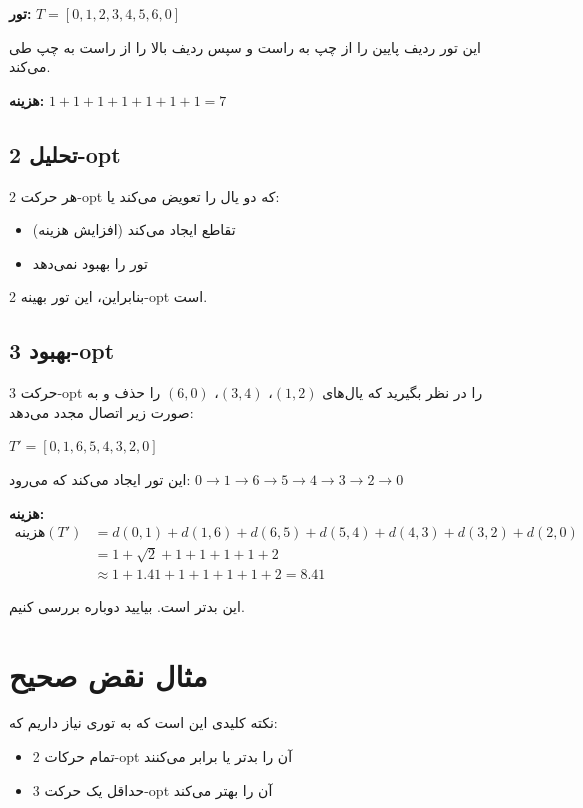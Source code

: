 \documentclass[12pt,a4paper]{article}
\begin{document}
\textbf{تور:} $T = [0, 1, 2, 3, 4, 5, 6, 0]$

این تور ردیف پایین را از چپ به راست و سپس ردیف بالا را از راست به چپ طی می‌کند.

\textbf{هزینه:} $1 + 1 + 1 + 1 + 1 + 1 + 1 = 7$

\subsection{تحلیل 2-opt}

هر حرکت 2-opt که دو یال را تعویض می‌کند یا:
\begin{itemize}
    \item تقاطع ایجاد می‌کند (افزایش هزینه)
    \item تور را بهبود نمی‌دهد
\end{itemize}

بنابراین، این تور بهینه 2-opt است.

\subsection{بهبود 3-opt}

حرکت 3-opt را در نظر بگیرید که یال‌های $(1,2)$، $(3,4)$، $(6,0)$ را حذف و به صورت زیر اتصال مجدد می‌دهد:

$T' = [0, 1, 6, 5, 4, 3, 2, 0]$

این تور ایجاد می‌کند که می‌رود: $0 \to 1 \to 6 \to 5 \to 4 \to 3 \to 2 \to 0$

\textbf{هزینه:}
\begin{align*}
\text{هزینه}(T') &= d(0,1) + d(1,6) + d(6,5) + d(5,4) + d(4,3) + d(3,2) + d(2,0) \\
&= 1 + \sqrt{2} + 1 + 1 + 1 + 1 + 2 \\
&\approx 1 + 1.41 + 1 + 1 + 1 + 1 + 2 = 8.41
\end{align*}

این بدتر است. بیایید دوباره بررسی کنیم.

\section{مثال نقض صحیح}

نکته کلیدی این است که به توری نیاز داریم که:
\begin{itemize}
    \item تمام حرکات 2-opt آن را بدتر یا برابر می‌کنند
    \item حداقل یک حرکت 3-opt آن را بهتر می‌کند
\end{itemize}
\end{document}
